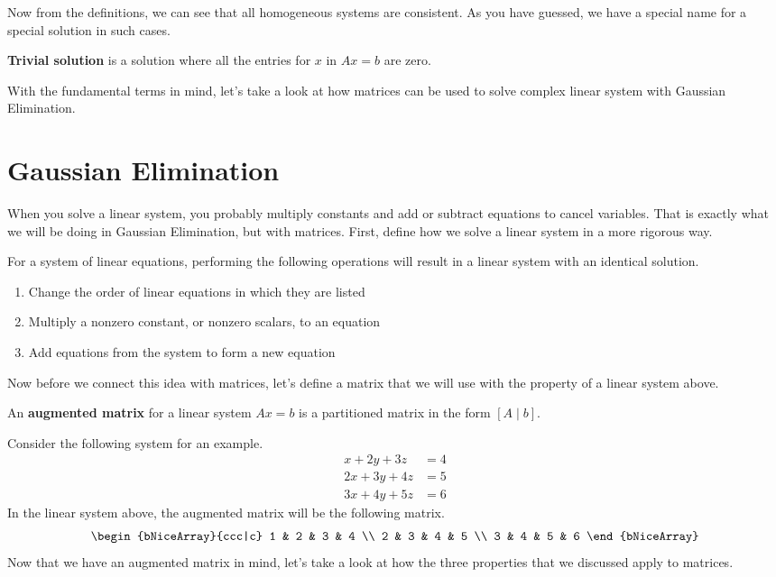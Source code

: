 \documentclass[../main.tex]{subfiles}
\begin{document}
Now from the definitions, we can see that all homogeneous systems
are consistent. As you have guessed, we have a special name for
a special solution in such cases.

\begin{definition}
\textbf{Trivial solution} is a solution where all the entries for
$x$ in $Ax = b$ are zero.
\end{definition}

With the fundamental terms in mind, let's take a look at how matrices
can be used to solve complex linear system with Gaussian Elimination.

\section{Gaussian Elimination}

When you solve a linear system, you probably multiply constants
and add or subtract equations to cancel variables. That is exactly
what we will be doing in Gaussian Elimination, but with matrices.
First, define how we solve a linear system in a more rigorous way.

\begin{definition}
For a system of linear equations, performing the following operations
will result in a linear system with an identical solution.
\begin{enumerate}[noitemsep]
\item
Change the order of linear equations in which they are listed
\item
Multiply a nonzero constant, or nonzero scalars, to an equation
\item
Add equations from the system to form a new equation
\end{enumerate}
\end{definition}

Now before we connect this idea with matrices, let's define a matrix
that we will use with the property of a linear system above.

\begin{definition}
An \textbf{augmented matrix} for a linear system $Ax = b$ is a
partitioned matrix in the form $[A \mid b]$.
\end{definition}

Consider the following system for an example.
\begin{align*}
    x + 2y + 3z &= 4 \\
    2x + 3y + 4z &= 5 \\
    3x + 4y + 5z &= 6
\end{align*}
In the linear system above, the augmented matrix will be the following
matrix.
\[
\begin{bNiceArray}{ccc|c}
    1 & 2 & 3 & 4 \\
    2 & 3 & 4 & 5 \\
    3 & 4 & 5 & 6
\end{bNiceArray}
\]
Now that we have an augmented matrix in mind, let's take a look at
how the three properties that we discussed apply to matrices.
\end{document}
